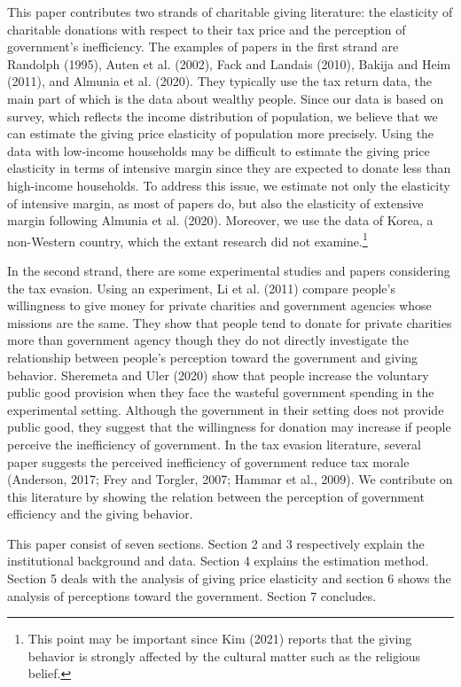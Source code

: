 \documentclass[ review  , 3p ]{elsarticle}
\begin{document}
  This paper contributes two strands of charitable giving literature: the elasticity of charitable donations with respect to their tax price and the perception of government's inefficiency. The examples of papers in the first strand are Randolph (1995), Auten et al. (2002), Fack and Landais (2010), Bakija and Heim (2011), and Almunia et al. (2020). They typically use the tax return data, the main part of which is the data about wealthy people. Since our data is based on survey, which reflects the income distribution of population, we believe that we can estimate the giving price elasticity of population more precisely. Using the data with low-income households may be difficult to estimate the giving price elasticity in terms of intensive margin since they are expected to donate less than high-income households. To address this issue, we estimate not only the elasticity of intensive margin, as most of papers do, but also the elasticity of extensive margin following Almunia et al. (2020).
  Moreover, we use the data of Korea, a non-Western country, which the extant research did not examine.\footnote{This point may be important since Kim (2021) reports that the giving behavior is strongly affected by the cultural matter such as the religious belief.}

  In the second strand, there are some experimental studies and papers considering the tax evasion. Using an experiment, Li et al. (2011) compare people's willingness to give money for private charities and government agencies whose missions are the same. They show that people tend to donate for private charities more than government agency though they do not directly investigate the relationship between people's perception toward the government and giving behavior. Sheremeta and Uler (2020) show that people increase the voluntary public good provision when they face the wasteful government spending in the experimental setting. Although the government in their setting does not provide public good, they suggest that the willingness for donation may increase if people perceive the inefficiency of government. In the tax evasion literature, several paper suggests the perceived inefficiency of government reduce tax morale (Anderson, 2017; Frey and Torgler, 2007; Hammar et al., 2009). We contribute on this literature by showing the relation between the perception of government efficiency and the giving behavior.

  This paper consist of seven sections. Section 2 and 3 respectively explain the institutional background and data. Section 4 explains the estimation method. Section 5 deals with the analysis of giving price elasticity and section 6 shows the analysis of perceptions toward the government. Section 7 concludes.
\end{document}
